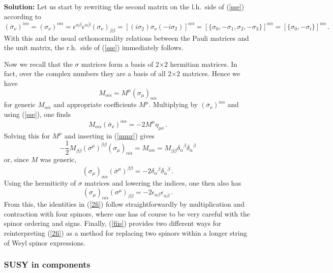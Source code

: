 \documentclass[12pt]{article}
\newcommand{\be}{\begin{equation}}
\newcommand{\ee}{\end{equation}}
\newcommand{\ol}{\overline}
\numberwithin{equation}{section}
\begin{document}
\noindent
{\bf Solution:} Let us start by rewriting the second matrix on the l.h.~side of (\ref{sse}) according to
\be
(\ol{\sigma}_\nu)^{\dot{\alpha}\alpha}=
(\sigma_\nu)^{\alpha\dot{\alpha}}=\epsilon^{\alpha\beta}
\epsilon^{\dot{\alpha}\dot{\beta}}(\sigma_\nu)_{\beta\dot{\beta}}= [(i\sigma_2)\sigma_\nu(-i\sigma_2)]^{\alpha\dot{\alpha}}
= [\{\sigma_0,-\sigma_1,\sigma_2,-\sigma_3\}]^{\alpha\dot{\alpha}}= [\{\sigma_0,-\sigma_i\}]^{\dot{\alpha}\alpha}\,.
\ee
With this and the usual orthonormality relations between the Pauli matrices and the unit matrix, the r.h.~side of (\ref{sse}) immediately follows.

Now we recall that the $\sigma$ matrices form a basis of 2$\times 2$ hermitian matrices. In fact, over the complex numbers they are a basis of all 2$\times 2$ matrices. Hence we have
\be
M_{\alpha\dot{\alpha}}=M^\mu(\sigma_\mu)_{\alpha\dot{\alpha}} \label{mmr}
\ee
for generic $M_{\alpha\dot{\alpha}}$ and appropriate coefficients $M^\mu$. Multiplying by $(\ol{\sigma}_\nu)^{\dot{\alpha}\alpha}$ and using (\ref{sse}), one finds
\be
M_{\alpha\dot{\alpha}}(\ol{\sigma}_\nu)^{\dot{\alpha}\alpha}=-2M^\mu\eta_{\mu\nu}\,.
\ee
Solving this for $M^\mu$ and inserting in (\ref{mmr}) gives
\be
-\frac{1}{2}M_{\beta\dot{\beta}}(\ol{\sigma}^\mu)^{\dot{\beta}\beta}(\sigma_\mu)_{\alpha\dot{\alpha}}= M_{\alpha\dot{\alpha}} = M_{\beta\dot{\beta}} \delta_\alpha{}^\beta \delta_{\dot{\alpha}}{}^{\dot{\beta}}
\ee
or, since $M$ was generic,
\be
(\sigma_\mu)_{\alpha\dot{\alpha}}
(\ol{\sigma}^\mu)^{\dot{\beta}\beta} = -2 
\delta_\alpha{}^\beta \delta_{\dot{\alpha}}{}^{\dot{\beta}} \,.
\ee
Using the hermiticity of $\sigma$ matrices and lowering the indices, one then also has
\be
(\sigma_\mu)_{\alpha\dot{\alpha}}
(\sigma^\mu)_{\beta\dot{\beta}} = -2 
\epsilon_{\alpha\beta} \epsilon_{\dot{\alpha}\dot{\beta}} \,.
\ee
From this, the identities in (\ref{2fi}) follow straightforwardly by multiplication and contraction with four spinors, where one has of course to be very careful with the spinor ordering and signs. Finally, (\ref{fiis}) provides two different ways for reinterpreting (\ref{2fi}) as a method for replacing two spinors within a longer string of Weyl spinor expressions.








\subsubsection{SUSY in components}
\end{document}

